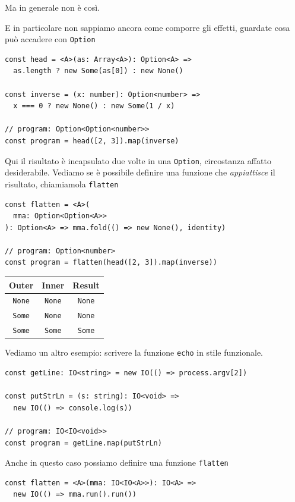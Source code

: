 \documentclass[12pt]{article}
\begin{document}
Ma in generale non è così.

E in particolare non sappiamo ancora come comporre gli effetti, guardate cosa può accadere con \texttt{Option}

\begin{verbatim}
const head = <A>(as: Array<A>): Option<A> =>
  as.length ? new Some(as[0]) : new None()

const inverse = (x: number): Option<number> =>
  x === 0 ? new None() : new Some(1 / x)

// program: Option<Option<number>>
const program = head([2, 3]).map(inverse)
\end{verbatim}

Qui il risultato è incapsulato due volte in una \texttt{Option}, circostanza affatto desiderabile.
Vediamo se è possibile definire una funzione che \emph{appiattisce} il risultato, chiamiamola \texttt{flatten}

\begin{verbatim}
const flatten = <A>(
  mma: Option<Option<A>>
): Option<A> => mma.fold(() => new None(), identity)

// program: Option<number>
const program = flatten(head([2, 3]).map(inverse))
\end{verbatim}

\begin{center}
\begin{tabular}{ c c c }
 Outer & Inner & Result \\
 \hline
 \texttt{None} & \texttt{None} & \texttt{None} \\
 \texttt{Some} & \texttt{None} & \texttt{None} \\
 \texttt{Some} & \texttt{Some} & \texttt{Some}
\end{tabular}
\end{center}

Vediamo un altro esempio: scrivere la funzione \texttt{echo} in stile funzionale.

\begin{verbatim}
const getLine: IO<string> = new IO(() => process.argv[2])

const putStrLn = (s: string): IO<void> =>
  new IO(() => console.log(s))

// program: IO<IO<void>>
const program = getLine.map(putStrLn)
\end{verbatim}

Anche in questo caso possiamo definire una funzione \texttt{flatten}

\begin{verbatim}
const flatten = <A>(mma: IO<IO<A>>): IO<A> =>
  new IO(() => mma.run().run())
\end{verbatim}
\end{document}
